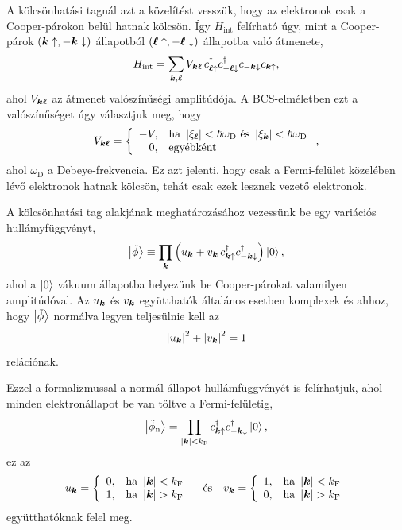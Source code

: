 \documentclass[a4paper,12pt,titlepage]{article}
\newcommand{\KK}{{\vb*{k}}}
\newcommand{\LL}{{\vb*{\ell}}}
\newcommand{\kF}{{k_\text{F}}}
\begin{document}
A kölcsönhatási tagnál azt a közelítést vesszük, hogy az elektronok csak a Cooper-párokon belül hatnak kölcsön.  Így $H_\text{int}$ felírható úgy, mint a Cooper-párok $\left( \KK \uparrow, -\KK \downarrow \right)$ állapotból $\left( \LL \uparrow, -\LL \downarrow \right)$ állapotba való átmenete,
\begin{equation} \label{H-int-def}
	H_\text{int} = \sum\limits_{\KK, \LL} V_{\KK \LL} \, c_{\LL \uparrow}^\dagger c_{-\LL \downarrow}^\dagger c_{-\KK \downarrow} c_{\KK \uparrow},
\end{equation}
ahol $V_{\KK \LL}$ az átmenet valószínűségi amplitúdója.  A BCS-elméletben ezt a valószínűséget úgy választjuk meg, hogy
$$ V_{\KK \LL} = \left\{ \begin{array}{rl}
	-V, & \text{ha } \left| \xi_\LL \right| < \hbar \omega_\text{D} \text{ és } \left| \xi_\KK \right| < \hbar \omega_\text{D} \\
	0, & \text{egyébként}
\end{array} \right. , $$
ahol $\omega_\text{D}$ a Debeye-frekvencia.  Ez azt jelenti, hogy csak a Fermi-felület közelében lévő elektronok hatnak kölcsön, tehát csak ezek lesznek vezető elektronok.

A kölcsönhatási tag alakjának meghatározásához vezessünk be egy variációs hullámyfüggvényt,
\begin{equation} \label{phi-tilde}
	\ket{\tilde{\phi}} \equiv \prod\limits_\KK \left( u_\KK + v_\KK \, c_{\KK \uparrow}^\dagger c_{-\KK \downarrow}^\dagger \right) \ket{0},
\end{equation}
ahol a $\ket{0}$ vákuum állapotba helyezünk be Cooper-párokat valamilyen amplitúdóval.  Az $u_\KK$ és $v_\KK$ együtthatók általános esetben komplexek és ahhoz, hogy $\ket{\tilde{\phi}}$ normálva legyen teljesülnie kell az
\begin{equation} \label{u-v-norm}
	\left| u_\KK \right|^2 + \left| v_\KK \right|^2 = 1
\end{equation}
relációnak.

Ezzel a formalizmussal a normál állapot hullámfüggvényét is felírhatjuk, ahol minden elektronállapot be van töltve a Fermi-felületig,
\begin{equation} \label{u-v-normal}
	\ket{\tilde{\phi}_\text{n}} = \prod\limits_{\left| \KK \right| < \kF} c_{\KK \uparrow}^\dagger c_{-\KK \downarrow}^\dagger \ket{0},
\end{equation}
ez az
\begin{equation} \label{u-v-sc}
	u_\KK = \left\{ \begin{array}{ll} 0, & \text{ha } \left| \KK \right| < \kF \\ 1, & \text{ha } \left| \KK \right| > \kF \end{array} \right.
	~~~ \text{és} ~~~
	v_\KK = \left\{ \begin{array}{ll} 1, & \text{ha } \left| \KK \right| < \kF \\ 0, & \text{ha } \left| \KK \right| > \kF \end{array} \right.
\end{equation}
együtthatóknak felel meg.
\end{document}
